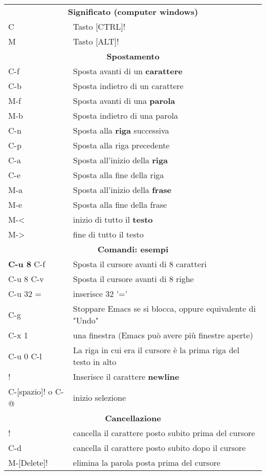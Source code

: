 \documentclass{article}
\begin{document}
\begin{tabular}{ll}
  \multicolumn{2}{c}{\textbf{Significato (computer windows)}}\\
  C & Tasto [CTRL]!\\
  M & Tasto [ALT]!\\
  \multicolumn{2}{c}{\textbf{Spostamento}}\\
  C-f & Sposta avanti di un \textbf{carattere}\\
  C-b & Sposta indietro di un carattere\\
  M-f & Sposta avanti di una \textbf{parola}\\
  M-b & Sposta indietro di una parola\\
  C-n & Sposta alla \textbf{riga} successiva\\
  C-p & Sposta alla riga precedente\\
  C-a & Sposta all'inizio della \textbf{riga}\\
  C-e & Sposta alla fine della riga\\
  M-a & Sposta all'inizio della \textbf{frase}\\
  M-e & Sposta alla fine della frase\\
  M-< & inizio di tutto il \textbf{testo}\\
  M-> & fine di tutto il testo\\
  \multicolumn{2}{c}{\textbf{Comandi: esempi}}\\
  \textbf{C-u 8} C-f & Sposta il cursore avanti di 8 caratteri\\
  C-u 8 C-v & Sposta il cursore avanti di 8 righe\\
  C-u 32 = & inserisce 32 '='\\
  C-g & Stoppare Emacs se si blocca, oppure equivalente di "Undo"\\
  C-x 1 & una finestra (Emacs può avere più finestre aperte)\\
  C-u 0 C-l & La riga in cui era il cursore è la prima riga del testo in alto\\
  [INVIO]! & Inserisce il carattere \textbf{newline}\\
  C-[spazio]! o C-@ & inizio selezione\\
  \multicolumn{2}{c}{\textbf{Cancellazione}}\\
  [Delete]! & cancella il carattere posto subito prima del cursore\\
  C-d & cancella il carattere posto subito dopo il cursore\\
  M-[Delete]! & elimina la parola posta prima del cursore\\

\end{tabular}
\end{document}
